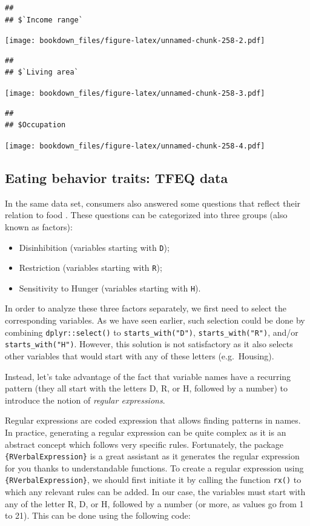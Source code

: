 \documentclass[
]{krantz}
\providecommand{\tightlist}{%
  \setlength{\itemsep}{0pt}\setlength{\parskip}{0pt}}
\begin{document}
\begin{verbatim}
## 
## $`Income range`
\end{verbatim}

\texttt{[image: bookdown\_files/figure-latex/unnamed-chunk-258-2.pdf]}

\begin{verbatim}
## 
## $`Living area`
\end{verbatim}

\texttt{[image: bookdown\_files/figure-latex/unnamed-chunk-258-3.pdf]}

\begin{verbatim}
## 
## $Occupation
\end{verbatim}

\texttt{[image: bookdown\_files/figure-latex/unnamed-chunk-258-4.pdf]}

\hypertarget{regex}{%
\subsection{Eating behavior traits: TFEQ data}\label{regex}}

In the same data set, consumers also answered some questions that reflect their relation to food \citep{stunkard1985}. These questions can be categorized into three groups (also known as factors):

\begin{itemize}
\tightlist
\item
  Disinhibition (variables starting with \texttt{D});
\item
  Restriction (variables starting with \texttt{R});
\item
  Sensitivity to Hunger (variables starting with \texttt{H}).
\end{itemize}

In order to analyze these three factors separately, we first need to select the corresponding variables. As we have seen earlier, such selection could be done by combining \texttt{dplyr::select()} to \texttt{starts\_with("D")}, \texttt{starts\_with("R")}, and/or \texttt{starts\_with("H")}. However, this solution is not satisfactory as it also selects other variables that would start with any of these letters (e.g.~Housing).

Instead, let's take advantage of the fact that variable names have a recurring pattern (they all start with the letters D, R, or H, followed by a number) to introduce the notion of \emph{regular expressions}.

Regular expressions are coded expression that allows finding patterns in names. In practice, generating a regular expression can be quite complex as it is an abstract concept which follows very specific rules. Fortunately, the package \texttt{\{RVerbalExpression\}} is a great assistant as it generates the regular expression for you thanks to understandable functions.
To create a regular expression using \texttt{\{RVerbalExpression\}}, we should first initiate it by calling the function \texttt{rx()} to which any relevant rules can be added. In our case, the variables must start with any of the letter R, D, or H, followed by a number (or more, as values go from 1 to 21). This can be done using the following code:
\end{document}
